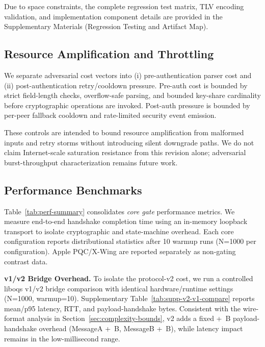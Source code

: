 \documentclass[10pt,journal,compsoc]{IEEEtran}
\begin{document}
Due to space constraints, the complete regression test matrix, TLV encoding validation, and implementation component details are provided in the Supplementary Materials (Regression Testing and Artifact Map).

\subsection{Resource Amplification and Throttling}\label{sec:resource-amplification}

We separate adversarial cost vectors into (i) pre-authentication parser
cost and (ii) post-authentication retry/cooldown pressure. Pre-auth
cost is bounded by strict field-length checks, overflow-safe parsing, and
bounded key-share cardinality before cryptographic operations are
invoked. Post-auth pressure is bounded by per-peer fallback cooldown and
rate-limited security event emission.

These controls are intended to bound resource amplification from malformed
inputs and retry storms without introducing silent downgrade paths. We do
not claim Internet-scale saturation resistance from this revision alone;
adversarial burst-throughput characterization remains future work.

\subsection{Performance Benchmarks}\label{c.-cost-centric-evaluation}

Table~\ref{tab:perf-summary} consolidates \emph{core gate} performance metrics. We measure \mbox{end-to-end} handshake completion time using an in-memory loopback transport to isolate cryptographic and state-machine overhead. Each core configuration reports distributional statistics after 10 warmup runs (N=1000 per configuration). Apple PQC/X-Wing are reported separately as non-gating contrast data.



\textbf{v1/v2 Bridge Overhead.}
To isolate the protocol-v2 cost, we run a controlled liboqs v1/v2 bridge
comparison with identical hardware/runtime settings (N=1000, warmup=10).
Supplementary Table~\ref{tab:supp-v2-v1-compare} reports mean/p95 latency,
RTT, and payload-handshake bytes. Consistent with the wire-format analysis in
Section~\ref{sec:complexity-bounds}, v2 adds a fixed +\claimVTwoDeltaPayloadBytes~B payload-handshake
overhead (MessageA +\claimVTwoDeltaMessageABytes~B, MessageB +\claimVTwoDeltaMessageBBytes~B), while latency impact remains in the
low-millisecond range.
\end{document}
